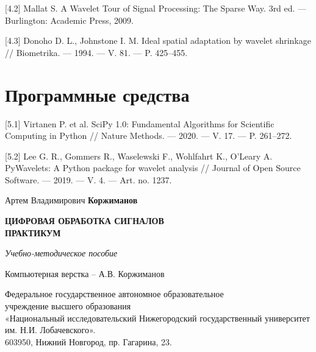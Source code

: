 \documentclass[12pt,a4paper,openany]{book}
\begin{document}
[4.2] Mallat S. A Wavelet Tour of Signal Processing: The Sparse Way. 3rd ed. --- Burlington: Academic Press, 2009.

[4.3] Donoho D. L., Johnstone I. M. Ideal spatial adaptation by wavelet shrinkage // Biometrika. --- 1994. --- V. 81. --- P. 425–455.

\section*{Программные средства}
[5.1] Virtanen P. et al. SciPy 1.0: Fundamental Algorithms for Scientific Computing in Python // Nature Methods. --- 2020. --- V. 17. --- P. 261–272.

[5.2] Lee G. R., Gommers R., Waselewski F., Wohlfahrt K., O'Leary A. PyWavelets: A Python package for wavelet analysis // Journal of Open Source Software. --- 2019. --- V. 4. --- Art. no. 1237.

\newpage
\thispagestyle{empty}

\begin{center}
    \vspace*{100mm}

    Артем Владимирович \textbf{Коржиманов}

    \vspace{28pt}

    \textbf{ЦИФРОВАЯ ОБРАБОТКА СИГНАЛОВ\\ ПРАКТИКУМ}

    \vspace{14pt}

    \textit{Учебно-методическое пособие}

    \vspace{28pt}

    Компьютерная верстка – А.В. Коржиманов

    \vspace{14pt}

    Федеральное государственное автономное образовательное\\ учреждение высшего образования\\
    «Национальный исследовательский Нижегородский государственный университет им. Н.И. Лобачевского».\\
    603950, Нижний Новгород, пр. Гагарина, 23.
\end{center}
\end{document}

